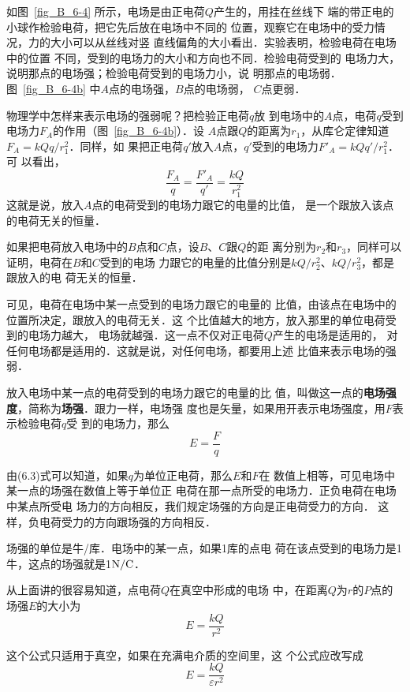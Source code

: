 如图~\ref{fig_B_6-4} 所示，电场是由正电荷$Q$产生的，用挂在丝线下
端的带正电的小球作检验电荷，把它先后放在电场中不同的
位置，观察它在电场中的受力情况，力的大小可以从丝线对竖
直线偏角的大小看出．实验表明，检验电荷在电场中的位置
不同，受到的电场力的大小和方向也不同．检验电荷受到的
电场力大，说明那点的电场强；检验电荷受到的电场力小，说
明那点的电场弱．图~\ref{fig_B_6-4b} 中$A$点的电场强，$B$点的电场弱，
$C$点更弱．

物理学中怎样来表示电场的强弱呢？把检验正电荷$q$放
到电场中的$A$点，电荷$q$受到电场力$F_A$的作用（图~\ref{fig_B_6-4b}）．设
$A$点跟$Q$的距离为$r_1$，从库仑定律知道$F_A=kQq/r^2_1$．同样，如
果把正电荷$q'$放入$A$点，$q'$受到的电场力$F'_A=kQq'/r_1^2$．可
以看出，
\[\frac{F_A}{q}=\frac{F'_A}{q'}=\frac{kQ}{r^2_1} \]
这就是说，放入$A$点的电荷受到的电场力跟它的电量的比值，
是一个跟放入该点的电荷无关的恒量．

如果把电荷放入电场中的$B$点和$C$点，设$B$、$C$跟$Q$的距
离分别为$r_2$和$r_3$，同样可以证明，电荷在$B$和$C$受到的电场
力跟它的电量的比值分别是$kQ/r^2_2$、$kQ/r_3^2$，都是跟放入的电
荷无关的恒量．

可见，电荷在电场中某一点受到的电场力跟它的电量的
比值，由该点在电场中的位置所决定，跟放入的电荷无关．这
个比值越大的地方，放入那里的单位电荷受到的电场力越大，
电场就越强．这一点不仅对正电荷$Q$产生的电场是适用的，
对任何电场都是适用的．这就是说，对任何电场，都要用上述
比值来表示电场的强弱．

放入电场中某一点的电荷受到的电场力跟它的电量的比
值，叫做这一点的\textbf{电场强度}，简称为\textbf{场强}．跟力一样，电场强
度也是矢量，如果用开表示电场强度，用$F$表示检验电荷$q$受
到的电场力，那么
\begin{equation}
    E=\frac{F}{q}
\end{equation}

由(6.3)式可以知道，如果$q$为单位正电荷，那么$E$和$F$在
数值上相等，可见电场中某一点的场强在数值上等于单位正
电荷在那一点所受的电场力．正负电荷在电场中某点所受电
场力的方向相反，我们规定场强的方向是正电荷受力的方向．
这样，负电荷受力的方向跟场强的方向相反．

场强的单位是牛/库．电场中的某一点，如果1库的点电
荷在该点受到的电场力是1牛，这点的场强就是1${\rm N}/{\rm C}$．

从上面讲的很容易知道，点电荷$Q$在真空中形成的电场
中，在距离$Q$为$r$的$P$点的场强$E$的大小为
\begin{equation}
    E=\frac{kQ}{r^2}
\end{equation}

这个公式只适用于真空，如果在充满电介质的空间里，这
个公式应改写成
\begin{equation}
    E=\frac{kQ}{\varepsilon r^2}
\end{equation}

